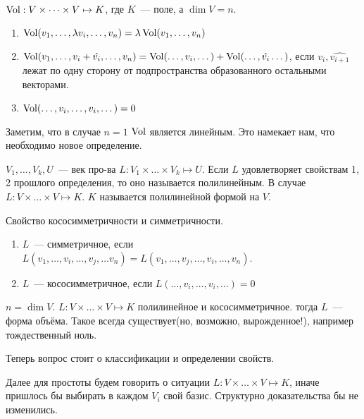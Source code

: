 \begin{definition}
    $\operatorname{Vol}: V\times \dots \times V \mapsto K$, где $K$~--- поле, а $\dim V = n$.
    \begin{enumerate}
        \item $\operatorname{Vol}(v_1,\dots, \lambda v_i, \dots, v_n) = \lambda \operatorname{Vol}(v_1,\dots, v_n)$
        \item $\operatorname{Vol}(v_1,\dots, v_i + \hat{v_i}, \dots, v_n) = 
            \operatorname{Vol}(\dots, v_i, \dots ) + \operatorname{Vol}(\dots, \hat{v_i} \dots)$,
            если $v_i, \hat{v_{i + 1}}$ лежат по одну сторону от подпространства образованного остальными векторами.
        \item $\operatorname{Vol}(\dots, v_i, \dots, v_i, \dots) = 0$
    \end{enumerate}
\end{definition}
\begin{remark}
    Заметим, что в случае $n = 1$ $\operatorname{Vol}$ является линейным. Это намекает нам, что необходимо
    новое определение.
\end{remark}
\begin{definition}
    $V_1,\dots, V_k, U$~--- век про-ва $L: V_1\times\dots\times V_k\mapsto U$.
    Если $L$ удовлетворяет свойствам 1, 2 прошлого определения, то оно называется полилинейным.
    В случае $L: V\times\dots\times V\mapsto K$. $K$ называется полилинейной формой на $V$.
\end{definition}
\begin{definition}
    Свойство кососимметричности и симметричности.
     \begin{enumerate}
         \item $L$~--- симметричное, если $L(v_1,\dots, v_i, \dots, v_j, \dots v_n) = L(v_1,\dots, v_j,\dots, v_i,\dots, v_n)$.
         \item $L$~--- кососимметричное, если $L(\dots, v_i, \dots, v_i, \dots) = 0$
    \end{enumerate}
\end{definition}
\begin{definition}
    $n = \dim V$. $L: V\times\dots\times V \mapsto K$ полилинейное и кососимметричное.
    тогда $L$~--- форма объёма. Такое всегда существует(но, возможно, вырожденное!), например тождественный ноль.
\end{definition}
\begin{motivation}
    Теперь вопрос стоит о классификации и определении свойств.
\end{motivation}
Далее для простоты будем говорить о ситуации $L: V\times\dots\times V\mapsto K$, иначе
пришлось бы выбирать в каждом $V_i$ свой базис. Структурно доказательства бы не изменились.

